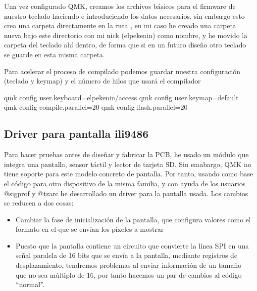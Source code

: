 Una vez configurado QMK, creamos los archivos básicos para el firmware de nuestro teclado haciendo  e introduciendo los datos necesarios, sin embargo esto crea una carpeta directamente en la ruta , en mi caso he creado una carpeta nueva bajo este directorio con mi nick (elpekenin) como nombre, y he movido la carpeta del teclado ahí dentro, de forma que si en un futuro diseño otro teclado se guarde en esta misma carpeta.

Para acelerar el proceso de compilado podemos guardar nuestra configuración (teclado y keymap) y el número de hilos que usará el compilador
\begin{multicli}
    \cliarrow qmk config user.keyboard=elpekenin/access \newline
    \cliarrow qmk config user.keymap=default \newline
    \cliarrow qmk config compile.parallel=20 \newline
    \cliarrow qmk config flash.parallel=20
\end{multicli}

\subsection{Driver para pantalla ili9486}
Para hacer pruebas antes de diseñar y fabricar la PCB, he usado un módulo que integra una pantalla, sensor táctil y lector de tarjeta SD. \newline
Sin emabargo, QMK no tiene soporte para este modelo concreto de pantalla. Por tanto, usando como base el código\cite{ili9488} para otro dispositivo de la misma familia, y con ayuda de los usuarios @sigprof y @tzarc he desarrollado un driver\cite{ili9486-pr} para la pantalla usada. \newline
Los cambios se reducen a dos cosas:
\begin{itemize}
    \item Cambiar la fase de inicialización de la pantalla, que configura valores como el formato en el que se envían los píxeles a mostrar
    \item Puesto que la pantalla contiene un circuito que convierte la línea SPI en una señal paralela de 16 bits que se envía a la pantalla, mediante registros de desplazamiento, tendremos problemas al enviar información de un tamaño que no sea múltiplo de 16, por tanto hacemos un par de cambios al código ``normal''.
\end{itemize}

